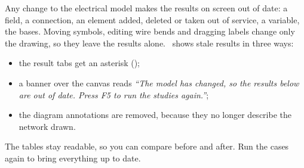 Any change to the electrical model makes the results on screen out of date: a field, a
connection, an element added, deleted or taken out of service, a variable, the bases.
Moving symbols, editing wire bends and dragging labels change only the drawing, so they
leave the results alone. \app\ shows stale results in three ways:

\begin{itemize}
  \item the result tabs get an asterisk ();
  \item a banner over the canvas reads \emph{``The model has changed, so the results below
    are out of date. Press F5 to run the studies again.''};
  \item the diagram annotations are removed, because they no longer describe the network
    drawn.
\end{itemize}

The tables stay readable, so you can compare before and after. Run the cases again to
bring everything up to date.
